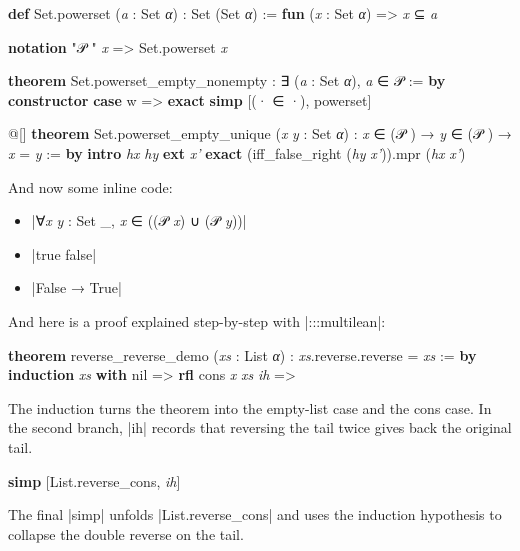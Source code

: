 \documentclass{memoir}
\newcommand{\coloredwave}[2]{\textcolor{#1}{\uwave{\textcolor{black}{#2}}}}
\newcommand{\infoDecorate}[1]{\coloredwave{infoColor}{#1}}
\begin{document}
\begin{LeanVerbatim}
\textbf{def} Set.powerset (\textit{a} : Set \textit{α}) : Set (Set \textit{α}) :=
  \textbf{fun} (\textit{x} : Set \textit{α}) => \textit{x} ⊆ \textit{a}

\textbf{notation} "𝒫 " \textit{x} => Set.powerset \textit{x}

\textbf{theorem} Set.powerset_empty_nonempty :
    ∃ (\textit{a} : Set \textit{α}), \textit{a} ∈ 𝒫  := \textbf{by}
  \textbf{constructor}
  \textbf{case} w => \textbf{exact} 
  \textbf{simp} [(· ∈ ·), powerset]

@[\infoDecorate{\textbf{grind?} →}]
\textbf{theorem} Set.powerset_empty_unique (\textit{x} \textit{y} : Set \textit{α}) :
    \textit{x} ∈ (𝒫 ) → \textit{y} ∈ (𝒫 ) → \textit{x} = \textit{y} := \textbf{by}
  \textbf{intro} \textit{hx} \textit{hy}
  \textbf{ext} \textit{x'}
  \textbf{exact} (iff_false_right (\textit{hy} \textit{x'})).mpr (\textit{hx} \textit{x'})

\end{LeanVerbatim}

And now some inline code:
\begin{itemize}
\item \LeanVerb|∀\textit{x} \textit{y} : Set _, \textit{x} ∈ ((𝒫 \textit{x}) ∪ (𝒫 \textit{y}))|
\item \LeanVerb|true  false|
\item \LeanVerb|False → True|

\end{itemize}

And here is a proof explained step-by-step with \LeanVerb|:::multilean|:
\begin{LeanVerbatim}
\textbf{theorem} reverse_reverse_demo (\textit{xs} : List \textit{α}) :
    \textit{xs}.reverse.reverse = \textit{xs} := \textbf{by}
  \textbf{induction} \textit{xs} \textbf{with}
   nil =>
      \textbf{rfl}
   cons \textit{x} \textit{xs} \textit{ih} =>
   
\end{LeanVerbatim}
The induction turns the theorem into the empty-list case and the cons case. In the second branch,
\LeanVerb|ih| records that reversing the tail twice gives back the original tail.\begin{LeanVerbatim}
       
      \textbf{simp} [List.reverse_cons, \textit{ih}]
   
\end{LeanVerbatim}
The final \LeanVerb|simp| unfolds \LeanVerb|List.reverse_cons| and uses the induction hypothesis to collapse the
double reverse on the tail.

\mainmatter
\end{document}
